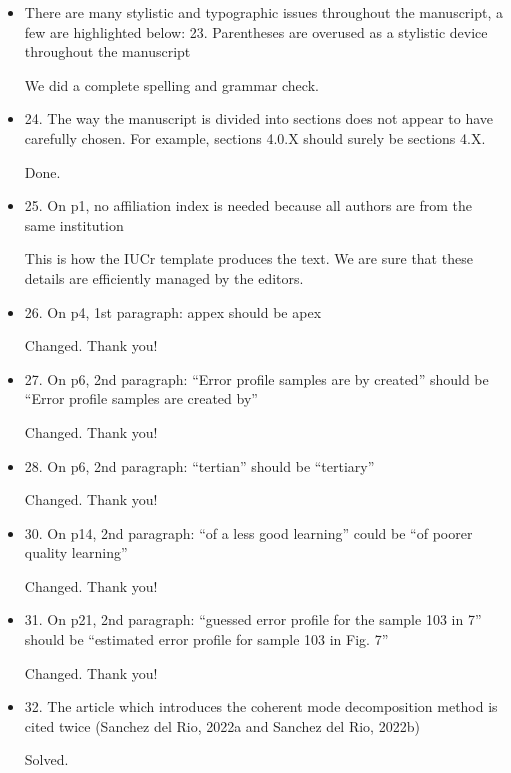 \documentclass[11pt]{letter} %
\newcommand{\inred}[1]{{\color{red}#1}}
\begin{document}
\begin{letter}{}
\begin{itemize}
    \item There are many stylistic and typographic issues throughout the manuscript, a few are highlighted below: 23. Parentheses are overused as a stylistic device throughout the manuscript
    
    \inred{We did a complete spelling and grammar check.}
    
    \item 24. The way the manuscript is divided into sections does not appear to have carefully chosen. For example, sections 4.0.X should surely be sections 4.X.
    
    \inred{Done.}
    
    \item 25. On p1, no affiliation index is needed because all authors are from the same institution
    
    \inred{This is how the IUCr template produces the text. We are sure that these details are efficiently managed by the editors.}
    
    \item 26. On p4, 1st paragraph: appex should be apex
    
    \inred{Changed. Thank you!}
    
    \item 27. On p6, 2nd paragraph: “Error profile samples are by created” should be “Error profile samples are created by”
    
    \inred{Changed. Thank you!}
    
    \item 28. On p6, 2nd paragraph: “tertian” should be “tertiary”
    
    \inred{Changed. Thank you!}
    
    \item 30. On p14, 2nd paragraph: “of a less good learning” could be “of poorer quality learning”
    
    \inred{Changed. Thank you!}
    
    \item 31. On p21, 2nd paragraph: “guessed error profile for the sample 103 in 7” should be “estimated error profile for sample 103 in Fig. 7”
    
    \inred{Changed. Thank you!}
    
    \item 32. The article which introduces the coherent mode decomposition method is cited twice (Sanchez del Rio, 2022a and Sanchez del Rio, 2022b)
    
    \inred{Solved.}
    
\end{itemize}

\end{letter}
 
\end{document}

